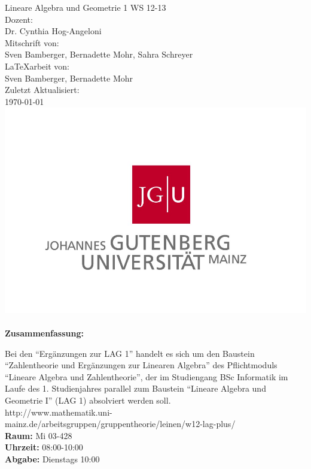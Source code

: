 \begin{titlepage}
\center
\Large Lineare Algebra und Geometrie 1 WS 12-13\large \\[2em]
Dozent:\\Dr. Cynthia Hog-Angeloni\\[2em]
Mitschrift von:\\Sven Bamberger, Bernadette Mohr, Sahra Schreyer\\[2em]
\LaTeX{arbeit} von:\\Sven Bamberger, Bernadette Mohr\\[2em]
Zuletzt Aktualisiert:\\\today\\
\includegraphics[scale=.2]{front/pics/Logo.jpg}\\\quad\\
\Large \textbf{Zusammenfassung:}\\[1em]
\parbox{0.75\textwidth}{\large
Bei den "`Ergänzungen zur LAG 1"' handelt es sich um den Baustein "`Zahlentheorie und Ergänzungen zur Linearen Algebra"' des Pflichtmoduls "`Lineare Algebra und Zahlentheorie"', der im Studiengang BSc Informatik im Laufe des 1. Studienjahres parallel zum Baustein "`Lineare Algebra und Geometrie I"' (LAG 1) absolviert werden soll.\\
http://www.mathematik.uni-mainz.de/arbeitsgruppen/gruppentheorie/leinen/w12-lag-plus/\\
\textbf{Raum:} Mi 03-428\\
\textbf{Uhrzeit:} 08:00-10:00\\
\textbf{Abgabe:} Dienstags 10:00\\
}
\end{titlepage}